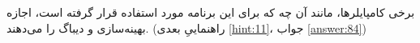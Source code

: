 \section{}
\paragraph{}\label{hint:147}
برخی کامپایلرها، مانند آن چه که برای این برنامه مورد استفاده قرار گرفته است، اجازه بهینه‌سازی و دیباگ را می‌دهند. (راهنماییِ بعدی \ref{hint:11}، جواب \ref{answer:84})
